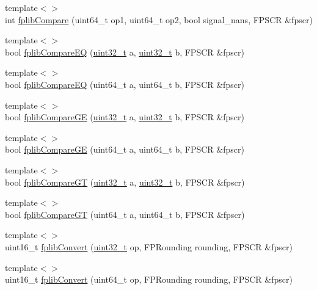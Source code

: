 \begin{DoxyCompactItemize}
\item 
{\footnotesize template$<$$>$ }\\int \hyperlink{namespaceArmISA_a34beafb8d1858aca73f2d6ba19d2d071}{fplibCompare} (uint64\_\-t op1, uint64\_\-t op2, bool signal\_\-nans, FPSCR \&fpscr)
\item 
{\footnotesize template$<$$>$ }\\bool \hyperlink{namespaceArmISA_a5a452aacea8a693e3b3d23e37aed05bd}{fplibCompareEQ} (\hyperlink{Type_8hh_a435d1572bf3f880d55459d9805097f62}{uint32\_\-t} a, \hyperlink{Type_8hh_a435d1572bf3f880d55459d9805097f62}{uint32\_\-t} b, FPSCR \&fpscr)
\item 
{\footnotesize template$<$$>$ }\\bool \hyperlink{namespaceArmISA_ab90e5e9c468f8626bb827d3221c50bfd}{fplibCompareEQ} (uint64\_\-t a, uint64\_\-t b, FPSCR \&fpscr)
\item 
{\footnotesize template$<$$>$ }\\bool \hyperlink{namespaceArmISA_a784bceb28834cf03f2f443bd3ae013cc}{fplibCompareGE} (\hyperlink{Type_8hh_a435d1572bf3f880d55459d9805097f62}{uint32\_\-t} a, \hyperlink{Type_8hh_a435d1572bf3f880d55459d9805097f62}{uint32\_\-t} b, FPSCR \&fpscr)
\item 
{\footnotesize template$<$$>$ }\\bool \hyperlink{namespaceArmISA_ab43e211947eccc582edade9ac9c05d0d}{fplibCompareGE} (uint64\_\-t a, uint64\_\-t b, FPSCR \&fpscr)
\item 
{\footnotesize template$<$$>$ }\\bool \hyperlink{namespaceArmISA_a73ac687d8fc0aa9507a3171faebce253}{fplibCompareGT} (\hyperlink{Type_8hh_a435d1572bf3f880d55459d9805097f62}{uint32\_\-t} a, \hyperlink{Type_8hh_a435d1572bf3f880d55459d9805097f62}{uint32\_\-t} b, FPSCR \&fpscr)
\item 
{\footnotesize template$<$$>$ }\\bool \hyperlink{namespaceArmISA_acdee82f04dfce59d6a6d75111186b10f}{fplibCompareGT} (uint64\_\-t a, uint64\_\-t b, FPSCR \&fpscr)
\item 
{\footnotesize template$<$$>$ }\\uint16\_\-t \hyperlink{namespaceArmISA_a12a7749861b3585bb2c43f78eda6e2ef}{fplibConvert} (\hyperlink{Type_8hh_a435d1572bf3f880d55459d9805097f62}{uint32\_\-t} op, FPRounding rounding, FPSCR \&fpscr)
\item 
{\footnotesize template$<$$>$ }\\uint16\_\-t \hyperlink{namespaceArmISA_a0d7d74a7a0431161d354f48235fa703c}{fplibConvert} (uint64\_\-t op, FPRounding rounding, FPSCR \&fpscr)

\end{DoxyCompactItemize}
